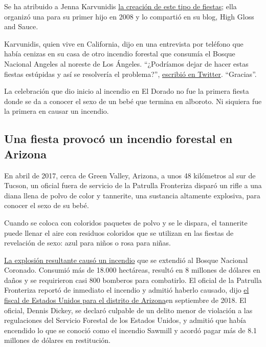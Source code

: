 Se ha atribuido a Jenna Karvunidis
\href{https://www.npr.org/2019/07/28/745990073/woman-who-popularized-gender-reveal-parties-says-her-views-on-gender-have-change}{la
creación de este tipo de fiestas}; ella organizó una para su primer hijo
en 2008 y lo compartió en su blog, High Gloss and Sauce.

Karvunidis, quien vive en California, dijo en una entrevista por
teléfono que había cenizas en su casa de otro incendio forestal que
consumía el Bosque Nacional Angeles al noreste de Los Ángeles.
``¿Podríamos dejar de hacer estas fiestas estúpidas y así se resolvería
el problema?'',
\href{https://twitter.com/HighGlossSauce/status/1302982395654631424}{escribió
en Twitter}. ``Gracias''.

La celebración que dio inicio al incendio en El Dorado no fue la primera
fiesta donde se da a conocer el sexo de un bebé que termina en alboroto.
Ni siquiera fue la primera en causar un incendio.

\hypertarget{una-fiesta-provocuxf3-un-incendio-forestal-en-arizona}{%
\subsection{Una fiesta provocó un incendio forestal en
Arizona}\label{una-fiesta-provocuxf3-un-incendio-forestal-en-arizona}}

En abril de 2017, cerca de Green Valley, Arizona, a unos 48 kilómetros
al sur de Tucson, un oficial fuera de servicio de la Patrulla Fronteriza
disparó un rifle a una diana llena de polvo de color y tannerite, una
sustancia altamente explosiva, para conocer el sexo de su bebé.

Cuando se coloca con coloridos paquetes de polvo y se le dispara, el
tannerite puede llenar el aire con residuos coloridos que se utilizan en
las fiestas de revelación de sexo: azul para niños o rosa para niñas.

\href{https://www.nytimes3xbfgragh.onion/2018/10/01/us/gender-reveal-arizona-fire.html}{La
explosión resultante causó un incendio} que se extendió al Bosque
Nacional Coronado. Consumió más de 18.000 hectáreas, resultó en 8
millones de dólares en daños y se requirieron casi 800 bomberos para
combatirlo. El oficial de la Patrulla Fronteriza reportó de inmediato el
incendio y admitió haberlo causado, dijo
\href{https://www.justice.gov/usao-az/pr/duty-border-patrol-agent-pleads-guilty-starting-2017-sawmill-fire-and-ordered-pay-more-8}{el
fiscal de Estados Unidos para el distrito de Arizona}en septiembre de
2018. El oficial, Dennis Dickey, se declaró culpable de un delito menor
de violación a las regulaciones del Servicio Forestal de los Estados
Unidos, y admitió que había encendido lo que se conoció como el incendio
Sawmill y acordó pagar más de 8.1 millones de dólares en restitución.


